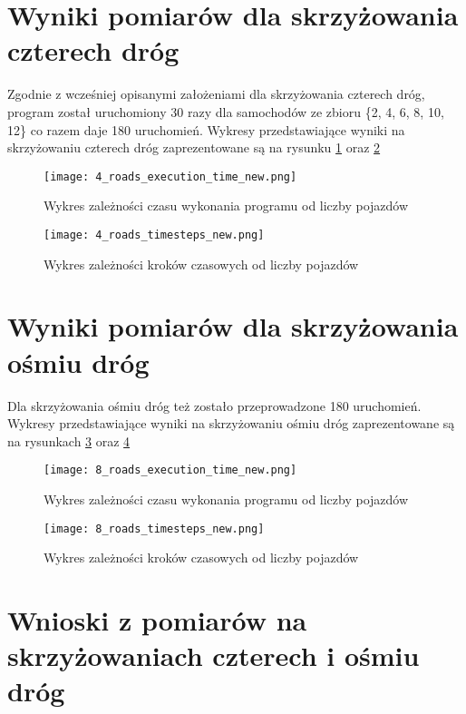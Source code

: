 \section{Wyniki pomiarów dla skrzyżowania czterech dróg}

Zgodnie z wcześniej opisanymi założeniami dla skrzyżowania czterech dróg, program został uruchomiony 30 razy dla samochodów ze zbioru \{2, 4, 6, 8, 10, 12\} co razem daje 180 uruchomień.
\newline
\newline
Wykresy przedstawiające wyniki na skrzyżowaniu czterech dróg zaprezentowane są na rysunku \ref{4_roads_execution_time_new} oraz \ref{four-roads-crossroads-timesteps}
\begin{figure}[H]
  \centering
  \texttt{[image: 4\_roads\_execution\_time\_new.png]}
  \caption{Wykres zależności czasu wykonania programu od liczby pojazdów}
  \label{4_roads_execution_time_new}
\end{figure}
\begin{figure}[H]
  \centering
  \texttt{[image: 4\_roads\_timesteps\_new.png]}
  \caption{Wykres zależności kroków czasowych od liczby pojazdów}
  \label{four-roads-crossroads-timesteps}
\end{figure}

\section{Wyniki pomiarów dla skrzyżowania ośmiu dróg}

Dla skrzyżowania ośmiu dróg też zostało przeprowadzone 180 uruchomień. Wykresy przedstawiające wyniki na skrzyżowaniu ośmiu dróg zaprezentowane są na rysunkach \ref{8_roads_execution_time_new} oraz \ref{8_roads_timesteps_new}
\begin{figure}[H]
  \centering
  \texttt{[image: 8\_roads\_execution\_time\_new.png]}
  \caption{Wykres zależności czasu wykonania programu od liczby pojazdów}
  \label{8_roads_execution_time_new}
\end{figure}
\begin{figure}[H]
  \centering
  \texttt{[image: 8\_roads\_timesteps\_new.png]}
  \caption{Wykres zależności kroków czasowych od liczby pojazdów}
  \label{8_roads_timesteps_new}
\end{figure}

\section{Wnioski z pomiarów na skrzyżowaniach czterech i ośmiu dróg}

